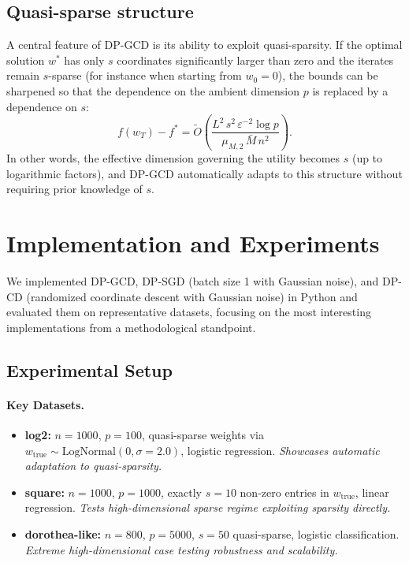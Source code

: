 \documentclass[11pt,a4paper]{article}
\begin{document}
\subsection{Quasi-sparse structure}

A central feature of DP-GCD is its ability to exploit quasi-sparsity. If the optimal solution $w^*$ has only $s$ coordinates significantly larger than zero and the iterates remain $s$-sparse (for instance when starting from $w_0 = 0$), the bounds can be sharpened so that the dependence on the ambient dimension $p$ is replaced by a dependence on $s$:
\[
f(w_T) - f^* = \widetilde{O}\!\left( \frac{L^2 \, s^2 \, \varepsilon^{-2} \log p}{\mu_{M,2} \, \bar{M} \, n^2} \right).
\]
In other words, the effective dimension governing the utility becomes $s$ (up to logarithmic factors), and DP-GCD automatically adapts to this structure without requiring prior knowledge of $s$.

\section{Implementation and Experiments}

We implemented DP-GCD, DP-SGD (batch size 1 with Gaussian noise), and DP-CD (randomized coordinate descent with Gaussian noise) in Python and evaluated them on representative datasets, focusing on the most interesting implementations from a methodological standpoint.

\subsection*{Experimental Setup}

\paragraph{Key Datasets.}
\begin{itemize}
\item \textbf{log2:} $n = 1000$, $p = 100$, quasi-sparse weights via $w_{\text{true}} \sim \text{LogNormal}(0, \sigma=2.0)$, logistic regression. \textit{Showcases automatic adaptation to quasi-sparsity.}

\item \textbf{square:} $n = 1000$, $p = 1000$, exactly $s = 10$ non-zero entries in $w_{\text{true}}$, linear regression. \textit{Tests high-dimensional sparse regime exploiting sparsity directly.}

\item \textbf{dorothea-like:} $n = 800$, $p = 5000$, $s = 50$ quasi-sparse, logistic classification. \textit{Extreme high-dimensional case testing robustness and scalability.}
\end{itemize}
\end{document}

